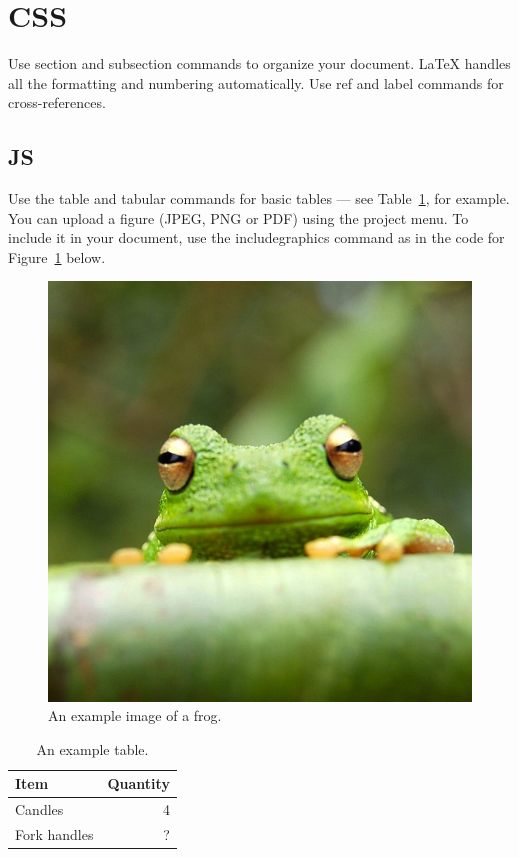 \documentclass[fleqn,10pt]{olplainarticle}
\begin{document}
	
	\section*{CSS}
	\label{sec:examples}
	
	Use section and subsection commands to organize your document. \LaTeX{} handles all the formatting and numbering automatically. Use ref and label commands for cross-references.
	
	\subsection*{JS}
	
	Use the table and tabular commands for basic tables --- see Table~\ref{tab:widgets}, for example. You can upload a figure (JPEG, PNG or PDF) using the project menu. To include it in your document, use the includegraphics command as in the code for Figure~\ref{fig:view} below.
	
	\begin{figure}[ht]
		\centering
		\includegraphics[width=0.7\linewidth]{frog}
		\caption{An example image of a frog.}
		\label{fig:view}
	\end{figure}
	
	\begin{table}[ht]
		\centering
		\begin{tabular}{l|r}
			Item & Quantity \\\hline
			Candles & 4 \\
			Fork handles & ?  
		\end{tabular}
		\caption{\label{tab:widgets}An example table.}
	\end{table}
	
\end{document}
